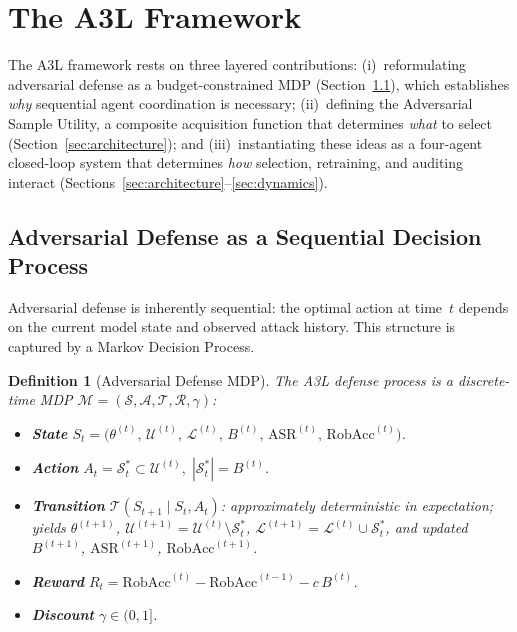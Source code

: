 \documentclass[review,1p,times,number]{elsarticle}
\newtheorem{definition}{Definition}
\begin{document}
\section{The A3L Framework}
\label{sec:framework}

The A3L framework rests on three layered contributions:
(i)~reformulating adversarial defense as a budget-constrained MDP
(Section~\ref{sec:mdp}), which establishes \textit{why} sequential
agent coordination is necessary;
(ii)~defining the Adversarial Sample Utility, a composite acquisition
function that determines \textit{what} to select
(Section~\ref{sec:architecture}); and
(iii)~instantiating these ideas as a four-agent closed-loop system
that determines \textit{how} selection, retraining, and auditing
interact (Sections~\ref{sec:architecture}--\ref{sec:dynamics}).

\subsection{Adversarial Defense as a Sequential Decision Process}
\label{sec:mdp}

Adversarial defense is inherently sequential: the optimal action at
time~$t$ depends on the current model state and observed attack
history. This structure is captured by a Markov Decision Process.

\begin{definition}[Adversarial Defense MDP]
\label{def:mdp}
The A3L defense process is a discrete-time MDP
$\mathcal{M} = (\mathcal{S}, \mathcal{A}, \mathcal{T}, \mathcal{R},
\gamma)$:
\begin{itemize}[leftmargin=1.5em,itemsep=2pt]
  \item \textbf{State}
    $S_t = \bigl(\theta^{(t)},\, \mathcal{U}^{(t)},\,
    \mathcal{L}^{(t)},\, B^{(t)},\,
    \mathrm{ASR}^{(t)},\, \mathrm{RobAcc}^{(t)}\bigr)$.
  \item \textbf{Action}
    $A_t = \mathcal{S}_t^* \subset \mathcal{U}^{(t)},\;
    |\mathcal{S}_t^*| = B^{(t)}$.
  \item \textbf{Transition}
    $\mathcal{T}(S_{t+1} \mid S_t, A_t)$: approximately deterministic
    in expectation; yields $\theta^{(t+1)}$,
    $\mathcal{U}^{(t+1)} {=} \mathcal{U}^{(t)} \setminus
    \mathcal{S}_t^*$,
    $\mathcal{L}^{(t+1)} {=} \mathcal{L}^{(t)} \cup \mathcal{S}_t^*$,
    and updated $B^{(t+1)}$, $\mathrm{ASR}^{(t+1)}$,
    $\mathrm{RobAcc}^{(t+1)}$.
  \item \textbf{Reward}
    $R_t = \mathrm{RobAcc}^{(t)} - \mathrm{RobAcc}^{(t-1)}
    - c\,B^{(t)}$.
    \label{eq:reward}
  \item \textbf{Discount} $\gamma \in (0,1]$.
\end{itemize}
\end{definition}
\end{document}
